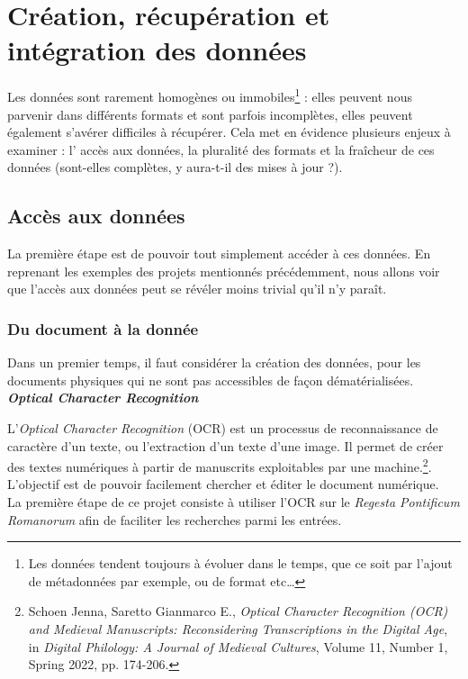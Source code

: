     \chapter{Création, récupération et intégration des données}

Les données sont rarement homogènes ou immobiles\footnote{Les données tendent toujours à évoluer dans le temps, que ce soit par l’ajout de métadonnées par exemple, ou de format etc…} : elles peuvent nous parvenir dans différents formats et sont parfois incomplètes, elles peuvent également s’avérer difficiles à récupérer. Cela met en évidence plusieurs enjeux à examiner :  l’ accès aux données, la pluralité des  formats et la fraîcheur de  ces données (sont-elles complètes, y aura-t-il des mises à jour ?).


    \section{Accès aux données}

La première étape est de pouvoir tout simplement accéder à ces données. En reprenant les exemples des projets mentionnés précédemment, nous allons voir que l’accès aux données peut se révéler moins trivial qu’il n’y paraît.

    \subsection{Du document à la donnée}

Dans un premier temps, il faut considérer la création des données, pour les documents physiques qui ne sont pas accessibles de façon dématérialisées.\\

\noindent \textbf{\textit{Optical Character Recognition}}

L’\textit{Optical Character Recognition} (OCR) est un processus de reconnaissance de caractère d’un texte, ou l’extraction d’un texte d’une image. Il permet de créer des textes numériques à partir de manuscrits exploitables par une machine.\footnote{Schoen Jenna, Saretto Gianmarco E., \textit{Optical Character Recognition (OCR) and Medieval Manuscripts: Reconsidering Transcriptions in the Digital Age}, in \textit{Digital Philology: A Journal of Medieval Cultures}, Volume 11, Number 1, Spring 2022, pp. 174-206.}. L'objectif est de pouvoir facilement chercher et éditer le document numérique.\\
La première étape de ce projet consiste à utiliser l'OCR sur le \textit{Regesta Pontificum Romanorum} afin de faciliter les recherches parmi les entrées.\\


